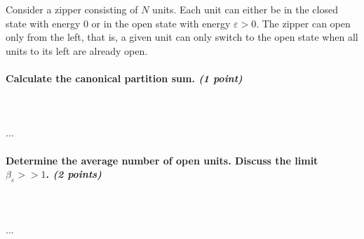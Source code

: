 Consider a zipper consisting of $N$ units. Each unit can either be in the 
closed state with energy 0 or in the open state with energy $\varepsilon>0$.
The zipper can open only from the left, that is, a given unit can only switch
to the open state when all units to its left are already open.

\paragraph{Calculate the canonical partition sum. \textit{(1 point)}} \ \\
    \\
    ...

\paragraph{Determine the average number of open units. Discuss the limit 
    $\beta_\varepsilon>>1$. \textit{(2 points)}} \ \\
    \\
    ...
 
